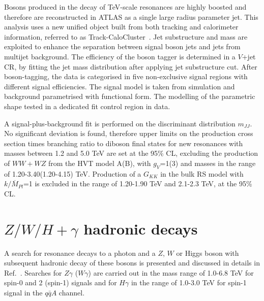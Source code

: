 \documentclass{PoS}
\begin{document}
Bosons produced in the decay of TeV-scale resonances are highly boosted and therefore are reconstructed in ATLAS as a single large radius parameter jet. 
This analysis uses a new unified object built from both tracking and calorimeter information, referred to as Track-CaloCluster~\cite{ATL-PHYS-PUB-2017-015}. 
Jet substructure and mass are exploited to enhance the separation between signal boson jets and jets from multijet background. 
The efficiency of the boson tagger is determined in a $V$+jet CR, by fitting the jet mass distribution after applying jet substructure cut. %
After boson-tagging, the data is categorised in five non-exclusive signal regions with different signal efficiencies.
The signal model is taken from simulation and background parametrised with functional form. 
The modelling of the parametric shape tested in a dedicated fit control region in data.

A signal-plus-background fit is performed on the discriminant distribution $m_{JJ}$.
No significant deviation is found, therefore upper limits on the production cross section times branching ratio to diboson final states for new resonances with masses between 1.2 and 5.0 TeV are set at the 95\% CL, excluding the production of $WW+WZ$ from the HVT model A(B), with $g_V$=1(3) and masses in the range of 1.20-3.40(1.20-4.15) TeV. 
Production of a $G_{KK}$ in the bulk RS model with $k/\overline{M}_{Pl}$=1 is excluded in the range of 1.20-1.90 TeV and 2.1-2.3 TeV, at the 95\% CL.
\vspace*{-2mm}

\section{$Z/W/H+\gamma$ hadronic decays}
\label{sec:gV}
\vspace*{-2mm}
A search for resonance decays to a photon and a $Z$, $W$ or Higgs boson with subsequent hadronic decay of these bosons is presented and discussed in details in Ref.~\cite{EXOT-2016-30}. 
Searches for $Z\gamma$ ($W\gamma$) are carried out in the mass range of 1.0-6.8 TeV for spin-0 and 2 (spin-1) signals and for $H\gamma$ in the range of 1.0-3.0 TeV for spin-1 signal in the $q\bar{q}A$ channel.
\end{document}
